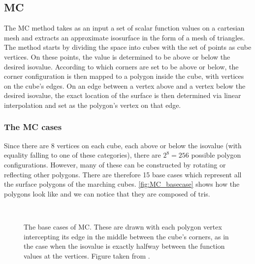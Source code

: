 \subsection{\Acl{MC}} 
The \acf{MC} method \cite{Marching2006} takes as an input a set of scalar function values on a cartesian mesh and extracts an approximate isosurface in the form of a mesh of triangles. The method starts by dividing the space into cubes with the set of points as cube vertices. On these points, the value is determined to be above or below the desired isovalue. According to which corners are set to be above or below, the corner configuration is then mapped to a polygon inside the cube, with vertices on the cube's edges. On an edge between a vertex above and a vertex below the desired isovalue, the exact location of the surface is then determined via linear interpolation and set as the polygon's vertex on that edge.

\subsubsection{The \acl{MC} cases}
Since there are 8 vertices on each cube, each above or below the isovalue (with equality falling to one of these categories), there are $2^8=256$ possible polygon configurations. However, many of these can be constructed by rotating or reflecting other polygons. There are therefore 15 base cases which represent all the surface polygons of the marching cubes. \autoref{fig:MC_basecase} shows how the polygons look like and we can notice that they are composed of \acp{tri}. 


\begin{figure}[b]
\centering
   \\
   \caption{The base cases of \ac{MC}. These are drawn with each polygon vertex intercepting its edge in the middle between the cube's corners, as in the case when the isovalue is exactly halfway between the function values at the vertices. Figure taken from \cite{Marching2006}.}
   \label{fig:MC_basecase}
\end{figure}


